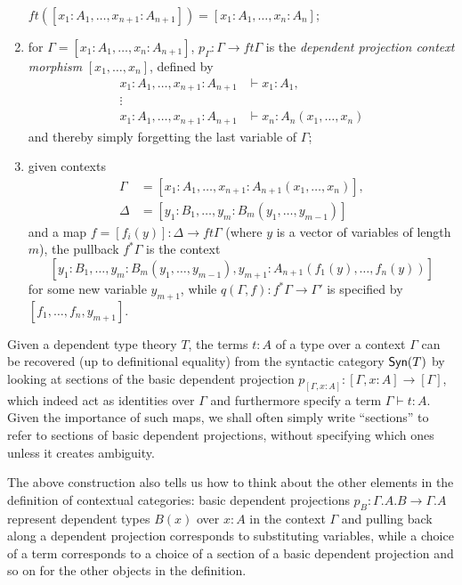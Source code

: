 \begin{construction}
\begin{enumerate}
      $ft([x_1:A_1,\ldots,x_{n+1}:A_{n+1}])=[x_1:A_1,\ldots,x_n:A_n]$;
    \item for $\Gamma=[x_1:A_1,\ldots,x_n:A_{n+1}]$,
      $p_{\Gamma}\colon\Gamma\rightarrow ft\Gamma$ is the \emph{dependent
      projection context morphism} $[x_1,\ldots,x_n]$, defined by
      \begin{align*}
        x_1:A_1,\ldots,x_{n+1}:A_{n+1} &\vdash x_1:A_1, \\
        \vdots & \\
        x_1:A_1,\ldots,x_{n+1}:A_{n+1} &\vdash x_n:A_n(x_1,\ldots,x_n)
      \end{align*}
      and thereby simply forgetting the last variable of $\Gamma$;
    \item given contexts
      \begin{align*}
        \Gamma &=[x_1:A_1,\ldots,x_{n+1}:A_{n+1}(x_1,\ldots,x_n)], \\
        \Delta &=[y_1:B_1,\ldots,y_m:B_m(y_1,\ldots,y_{m-1})]
      \end{align*}
      and a map $f=[f_i(y)]\colon\Delta\rightarrow ft\Gamma$ (where $y$ is a
      vector of variables of length $m$), the pullback $f^*\Gamma$ is the
      context
      \[[y_1:B_1,\ldots,y_m:B_m(y_1,\ldots,y_{m-1}),y_{m+1}:A_{n+1}(f_1(y),\ldots,f_n(y))]\]
      for some new variable $y_{m+1}$, while $q(\Gamma,f)\colon
      f^*\Gamma\rightarrow\Gamma'$ is specified by $[f_1,\ldots,f_n,y_{m+1}]$.
  \end{enumerate}
\end{construction}

\begin{rmk}
  Given a dependent type theory $T$, the terms $t:A$ of a type over a context
  $\Gamma$ can be recovered (up to definitional equality) from the syntactic
  category $\operatorname{\mathsf{Syn}}(T)$ by looking at sections of the basic dependent projection
  $p_{[\Gamma,x:A]}\colon[\Gamma,x:A]\rightarrow[\Gamma]$, which indeed act as
  identities over $\Gamma$ and furthermore specify a term $\Gamma\vdash t:A$.
  Given the importance of such maps, we shall often simply write ``sections'' to
  refer to sections of basic dependent projections, without specifying which ones
  unless it creates ambiguity.

  The above construction also tells us how to think about the other elements in
  the definition of contextual categories: basic dependent
  projections $p_B\colon\Gamma.A.B\rightarrow\Gamma.A$ represent dependent
  types $B(x)$ over $x:A$ in the context $\Gamma$ and pulling back along
  a dependent projection corresponds to substituting variables, while a choice of
  a term corresponds to a choice of a section of a basic dependent projection
  and so on for the other objects in the definition.
\end{rmk}

